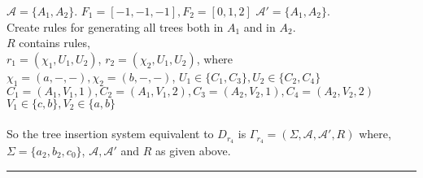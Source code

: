 \begin{example}
$\mathcal{A} =\{A_1,A_2\}$. $F_1=[-1,-1,-1],F_2=[0,1,2]$
$\mathcal{A}' =\{A_1,A_2\}$.\\

Create rules for generating all trees both in $A_1$ and in $A_2$.\\
$R$ contains rules,\\
   $r_1=(\chi _1,U_1,U_2)$,
   $r_2=(\chi _2, U_1,U_2)$,
  where \\
   $\chi _1=(a,-,-),\chi _2=(b,-,-)$,
   $U_1\in \{C_1,C_3\},U_2\in \{C_2,C_4\}$\\%
    $C_1 =(A_1,V_1,1),C_2=(A_1,V_1,2),C_3=(A_2,V_2,1),C_4=(A_2,V_2,2)$\\
    $V_1\in \{c,b\},V_2\in \{a,b\}$\\\\
So the tree insertion system equivalent to $D_{r_{4}}$ is            
$\Gamma _{r_{4}} = (\Sigma ,\mathcal{A},\mathcal{A} ',R)$ where,\\

    $\Sigma =\{a_2,b_2,c_0\}$,  
$\mathcal{A} ,\mathcal{A}'$ and $R$ as given above.\\

\noindent \rule{\textwidth}{1pt}
\end{example}    





